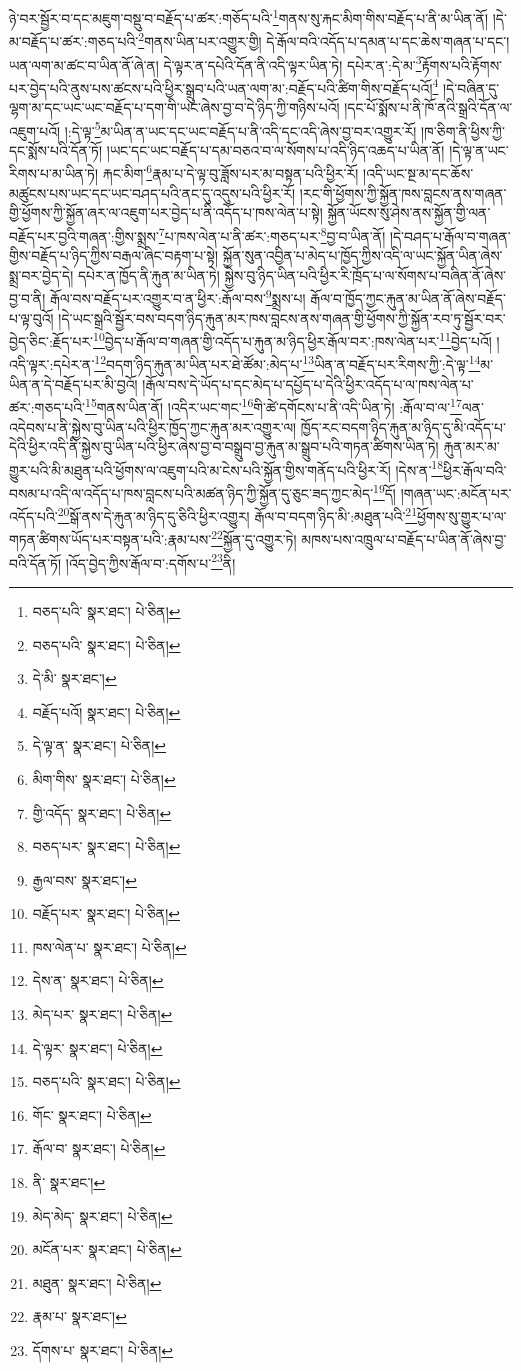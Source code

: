 ཉེ་བར་སྦྱོར་བ་དང་མཇུག་བསྡུ་བ་བརྗོད་པ་ཚར་:གཅོད་པའི་\footnote{བཅད་པའི་  སྣར་ཐང་།  པེ་ཅིན། }གནས་སུ་རྐང་མིག་གིས་བརྗོད་པ་ནི་མ་ཡིན་ནོ། །དེ་མ་བརྗོད་པ་ཚར་:གཅད་པའི་\footnote{བཅད་པའི་  སྣར་ཐང་།  པེ་ཅིན། }གནས་ཡིན་པར་འགྱུར་གྱི། དེ་རྒོལ་བའི་འདོད་པ་དམན་པ་དང་ཆེས་གཞན་པ་དང་། ཡན་ལག་མ་ཚང་བ་ཡིན་ནོ་ཞེ་ན། དེ་ལྟར་ན་དཔེའི་དོན་ནི་འདི་ལྟར་ཡིན་ཏེ། དཔེར་ན་:དེ་མ་\footnote{དེ་མི་  སྣར་ཐང་། }རྟོགས་པའི་རྟོགས་པར་བྱེད་པའི་ནུས་པས་ཚངས་པའི་ཕྱིར་སྒྲུབ་པའི་ཡན་ལག་མ་:བརྗོད་པའི་ཚིག་གིས་བརྗོད་པའོ།\footnote{བརྗོད་པའོ།  སྣར་ཐང་།  པེ་ཅིན། } །དེ་བཞིན་དུ་ལྷག་མ་དང་ཡང་ཡང་བརྗོད་པ་དག་གི་ཡང་ཞེས་བྱ་བ་དེ་ཉིད་ཀྱི་གཉིས་པའོ། །དང་པོ་སྨོས་པ་ནི་ཁོ་ནའི་སྒྲའི་དོན་ལ་འཇུག་པའོ། །:དེ་ལྟ་\footnote{དེ་ལྟ་ན་  སྣར་ཐང་།  པེ་ཅིན། }མ་ཡིན་ན་ཡང་དང་ཡང་བརྗོད་པ་ནི་འདི་དང་འདི་ཞེས་བྱ་བར་འགྱུར་རོ། །ཁ་ཅིག་ནི་ཕྱིས་ཀྱི་དང་སྨོས་པའི་དོན་ཏོ། །ཡང་དང་ཡང་བརྗོད་པ་དམ་བཅའ་བ་ལ་སོགས་པ་འདི་ཉིད་འཆད་པ་ཡིན་ནོ། །དེ་ལྟ་ན་ཡང་རིགས་པ་མ་ཡིན་ཏེ། རྐང་མིག་\footnote{མིག་གིས་  སྣར་ཐང་།  པེ་ཅིན། }རྣམ་པ་དེ་ལྟ་བུ་ཟློས་པར་མ་བསྟན་པའི་ཕྱིར་རོ། །འདི་ཡང་སྔ་མ་དང་ཆོས་མཚུངས་པས་ཡང་དང་ཡང་བཤད་པའི་ནང་དུ་འདུས་པའི་ཕྱིར་རོ། །རང་གི་ཕྱོགས་ཀྱི་སྐྱོན་ཁས་བླངས་ནས་གཞན་གྱི་ཕྱོགས་ཀྱི་སྐྱོན་ཞར་ལ་འཇུག་པར་བྱེད་པ་ནི་འདོད་པ་ཁས་ལེན་པ་སྟེ། སྐྱོན་ཡོངས་སུ་ཤེས་ནས་སྐྱོན་གྱི་ལན་བརྗོད་པར་བྱའི་གཞན་:གྱིས་སྨྲས་\footnote{གྱི་འདོད་  སྣར་ཐང་།  པེ་ཅིན། }པ་ཁས་ལེན་པ་ནི་ཚར་:གཅད་པར་\footnote{བཅད་པར་  སྣར་ཐང་།  པེ་ཅིན། }བྱ་བ་ཡིན་ནོ། །དེ་བཤད་པ་རྒོལ་བ་གཞན་གྱིས་བརྗོད་པ་ཉིད་ཀྱིས་བརྒལ་ཞིང་བརྟག་པ་སྟེ། སྐྱོན་སུན་འབྱིན་པ་མེད་པ་ཁྱོད་ཀྱིས་འདི་ལ་ཡང་སྐྱོན་ཡིན་ཞེས་སྨྲ་བར་བྱེད་དེ། དཔེར་ན་ཁྱོད་ནི་རྐུན་མ་ཡིན་ཏེ། སྐྱེས་བུ་ཉིད་ཡིན་པའི་ཕྱིར་རི་ཁྲོད་པ་ལ་སོགས་པ་བཞིན་ནོ་ཞེས་བྱ་བ་ནི། རྒོལ་བས་བརྗོད་པར་འགྱུར་བ་ན་ཕྱིར་:རྒོལ་བས་\footnote{རྒྱལ་བས་  སྣར་ཐང་། }སྨྲས་པ། རྒོལ་བ་ཁྱོད་ཀྱང་རྐུན་མ་ཡིན་ནོ་ཞེས་བརྗོད་པ་ལྟ་བུའོ། །དེ་ཡང་སྒྲའི་སྦྱོར་བས་བདག་ཉིད་རྐུན་མར་ཁས་བླངས་ནས་གཞན་གྱི་ཕྱོགས་ཀྱི་སྐྱོན་རབ་ཏུ་སྦྱོར་བར་བྱེད་ཅིང་:རྗོད་པར་\footnote{བརྗོད་པར་  སྣར་ཐང་།  པེ་ཅིན། }བྱེད་པ་རྒོལ་བ་གཞན་གྱི་འདོད་པ་རྐུན་མ་ཉིད་ཕྱིར་རྒོལ་བར་:ཁས་ལེན་པར་\footnote{ཁས་ལེན་པ་  སྣར་ཐང་།  པེ་ཅིན། }བྱེད་པའོ། །འདི་ལྟར་:དཔེར་ན་\footnote{དེས་ན་  སྣར་ཐང་།  པེ་ཅིན། }བདག་ཉིད་རྐུན་མ་ཡིན་པར་ཐེ་ཚོམ་:མེད་པ་\footnote{མེད་པར་  སྣར་ཐང་།  པེ་ཅིན། }ཡིན་ན་བརྗོད་པར་རིགས་ཀྱི་:དེ་ལྟ་\footnote{དེ་ལྟར་  སྣར་ཐང་།  པེ་ཅིན། }མ་ཡིན་ན་དེ་བརྗོད་པར་མི་བྱའོ། །རྒོལ་བས་དེ་ཡོད་པ་དང་མེད་པ་དཔྱོད་པ་དེའི་ཕྱིར་འདོད་པ་ལ་ཁས་ལེན་པ་ཚར་:གཅད་པའི་\footnote{བཅད་པའི་  སྣར་ཐང་།  པེ་ཅིན། }གནས་ཡིན་ནོ། །འདིར་ཡང་གང་\footnote{གོང་  སྣར་ཐང་།  པེ་ཅིན། }གི་ཚེ་དགོངས་པ་ནི་འདི་ཡིན་ཏེ། :རྒོལ་བ་ལ་\footnote{རྒོལ་བ་  སྣར་ཐང་།  པེ་ཅིན། }ལན་འདེབས་པ་ནི་སྐྱེས་བུ་ཡིན་པའི་ཕྱིར་ཁྱོད་ཀྱང་རྐུན་མར་འགྱུར་ལ། ཁྱོད་རང་བདག་ཉིད་རྐུན་མ་ཉིད་དུ་མི་འདོད་པ་དེའི་ཕྱིར་འདི་ནི་སྐྱེས་བུ་ཡིན་པའི་ཕྱིར་ཞེས་བྱ་བ་བསྒྲུབ་བྱ་རྐུན་མ་སྒྲུབ་པའི་གཏན་ཚིགས་ཡིན་ཏེ། རྐུན་མར་མ་གྱུར་པའི་མི་མཐུན་པའི་ཕྱོགས་ལ་འཇུག་པའི་མ་ངེས་པའི་སྐྱོན་གྱིས་གནོད་པའི་ཕྱིར་རོ། །དེས་ན་\footnote{ནི་  སྣར་ཐང་། }ཕྱིར་རྒོལ་བའི་བསམ་པ་འདི་ལ་འདོད་པ་ཁས་བླངས་པའི་མཚན་ཉིད་ཀྱི་སྐྱོན་དུ་ཅུང་ཟད་ཀྱང་མེད་\footnote{མེད་མེད་  སྣར་ཐང་།  པེ་ཅིན། }དོ། །གཞན་ཡང་:མངོན་པར་འདོད་པའི་\footnote{མངོན་པར་  སྣར་ཐང་།  པེ་ཅིན། }སྒོ་ནས་དེ་རྐུན་མ་ཉིད་དུ་ཅིའི་ཕྱིར་འགྱུར། རྒོལ་བ་བདག་ཉིད་མི་:མཐུན་པའི་\footnote{མཐུན་  སྣར་ཐང་།  པེ་ཅིན། }ཕྱོགས་སུ་གྱུར་པ་ལ་གཏན་ཚིགས་ཡོད་པར་བསྟན་པའི་:རྣམ་པས་\footnote{རྣམ་པ་  སྣར་ཐང་། }སྐྱོན་དུ་འགྱུར་ཏེ། མཁས་པས་འཁྲུལ་པ་བརྗོད་པ་ཡིན་ནོ་ཞེས་བྱ་བའི་དོན་ཏོ། །འོད་བྱེད་ཀྱིས་རྒོལ་བ་:དགོས་པ་\footnote{དོགས་པ་  སྣར་ཐང་།  པེ་ཅིན། }ནི། 